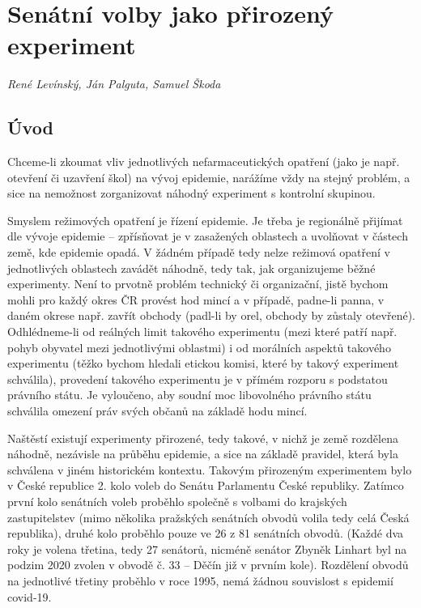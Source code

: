 
\chapter{Senátní volby jako přirozený experiment}\label{Prirozene_experimenty}

\textit{René Levínský, Ján Palguta, Samuel Škoda}

\section*{Úvod}
Chceme-li zkoumat vliv jednotlivých nefarmaceutických opatření (jako je např. otevření či uzavření škol) na vývoj epidemie, narážíme vždy na stejný problém, a sice na nemožnost zorganizovat náhodný experiment s kontrolní skupinou. 

Smyslem režimových opatření je řízení epidemie. Je třeba je regionálně přijímat dle vývoje epidemie -- zpřísňovat je v zasažených oblastech a uvolňovat v částech země, kde epidemie opadá. V žádném případě tedy nelze režimová opatření v jednotlivých oblastech zavádět náhodně, tedy tak, jak organizujeme běžné experimenty. Není to prvotně problém technický či organizační, jistě bychom mohli pro každý okres ČR provést hod mincí a v případě, padne-li panna, v daném okrese např. zavřít obchody (padl-li by orel, obchody by zůstaly otevřené). Odhlédneme-li od reálných limit takového experimentu (mezi které patří např. pohyb obyvatel mezi jednotlivými oblastmi) i od morálních aspektů takového experimentu (těžko bychom hledali etickou komisi, které by takový experiment schválila), provedení takového experimentu je v přímém rozporu s podstatou právního státu. Je vyloučeno, aby soudní moc libovolného právního státu schválila omezení práv svých občanů na základě hodu mincí.

Naštěstí existují experimenty přirozené, tedy takové, v nichž je země rozdělena náhodně, nezávisle na průběhu epidemie, a sice na základě pravidel, která byla schválena v jiném historickém kontextu. Takovým přirozeným experimentem bylo v České republice 2. kolo voleb do Senátu Parlamentu České republiky. Zatímco první kolo senátních voleb proběhlo společně s volbami do krajských zastupitelstev (mimo několika pražských senátních obvodů volila tedy celá Česká republika), druhé kolo proběhlo pouze ve 26 z 81 senátních obvodů. (Každé dva roky je volena třetina, tedy 27 senátorů, nicméně senátor Zbyněk Linhart byl na podzim 2020 zvolen v obvodě č. 33 -- Děčín již v prvním kole). Rozdělení obvodů na jednotlivé třetiny 
proběhlo v roce 1995, nemá žádnou souvislost s epidemií covid-19. 

